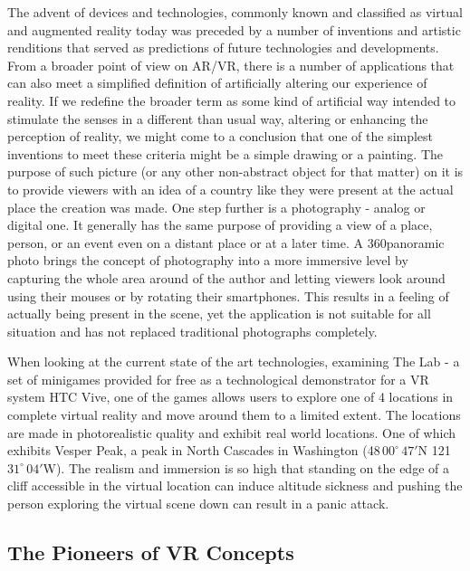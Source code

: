 \documentclass[12pt, a4paper]{article}
\def\nswe#1#2#3{#1\,$#2^\circ\,#3'$}
\begin{document}
The advent of devices and technologies, commonly known and classified as virtual and augmented reality today was preceded by a number of inventions and artistic renditions that served as predictions of future technologies and developments. From a broader point of view on AR/VR, there is a number of applications that can also meet a simplified definition of artificially altering our experience of reality. If we redefine the broader term as some kind of artificial way intended to stimulate the senses in a different than usual way, altering or enhancing the perception of reality, we might come to a conclusion that one of the simplest inventions to meet these criteria might be a simple drawing or a painting. The purpose of such picture (or any other non-abstract object for that matter) on it is to provide viewers with an idea of a country like they were present at the actual place the creation was made. One step further is a photography - analog or digital one. It generally has the same purpose of providing a view of a place, person, or an event even on a distant place or at a later time. A 360\degree panoramic photo brings the concept of photography into a more immersive level by capturing the whole area around of the author and letting viewers look around using their mouses or by rotating their smartphones. This results in a feeling of actually being present in the scene, yet the application is not suitable for all situation and has not replaced traditional photographs completely.
 
When looking at the current state of the art technologies, examining The Lab - a set of minigames provided for free as a technological demonstrator for a VR system HTC Vive, one of the games allows users to explore one of 4 locations in complete virtual reality and move around them to a limited extent. The locations are made in photorealistic quality and exhibit real world locations. One of which exhibits Vesper Peak, a peak in North Cascades in Washington (\nswe{48}{00}{47}N \nswe{121}{31}{04}W). The realism and immersion is so high that standing on the edge of a cliff accessible in the virtual location can induce altitude sickness and pushing the person exploring the virtual scene down can result in a panic attack.


\subsection{The Pioneers of VR Concepts}
\end{document}
